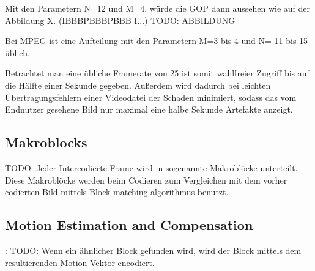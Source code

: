 Mit den Parametern N=12 und M=4, würde die GOP dann aussehen wie auf der Abbildung X. (IBBBPBBBPBBB I...) TODO: ABBILDUNG 

Bei MPEG ist eine Aufteilung mit den Parametern M=3 bis 4 und N= 11 bis 15 üblich.

Betrachtet man eine übliche Framerate von 25 ist somit wahlfreier Zugriff bis auf die Hälfte einer Sekunde gegeben. Außerdem wird dadurch bei leichten Übertragungsfehlern einer Videodatei der Schaden minimiert, sodass das vom Endnutzer gesehene Bild nur maximal eine halbe Sekunde Artefakte anzeigt.

\subsection{Makroblocks}
TODO:
Jeder Intercodierte Frame wird in sogenannte Makroblöcke unterteilt. Diese Makroblöcke werden beim Codieren zum Vergleichen mit dem vorher codierten Bild mittels Block matching algorithmus benutzt.
\subsection{Motion Estimation and Compensation}: 
TODO:
Wenn ein ähnlicher Block gefunden wird, wird der Block mittels dem resultierenden Motion Vektor encodiert.